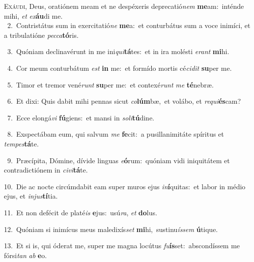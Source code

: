 \lettrine{\initial\textcolor{\initialcolor}{E}}{xáudi,} Deus, oratiónem meam et ne despéxeris deprecatió\textit{nem} \textbf{me}\-am:~\star inténde mihi, \textit{et} \textit{ex}\-\textbf{áu}di me.\\
{\numbfont\textcolor{\numbcolor}{~2.}}~Contristátus sum in exercitatió\textit{ne} \textbf{me}\-a:~\star et conturbátus sum a voce inimíci, et a tribulatióne \textit{pec}\-\textit{ca}\textbf{tó}ris.\par
{\numbfont\textcolor{\numbcolor}{~3.}}~Quóniam declinavérunt in me ini\-\textit{qui}\-\textbf{tá}tes:~\star et in ira molésti \textit{e}\-\textit{rant} \textbf{mi}\-hi.\par
{\numbfont\textcolor{\numbcolor}{~4.}}~Cor meum conturbátum \textit{est} \textbf{in} me:~\star et formído mortis cé\-\textit{ci}\-\textit{dit} \textbf{su}\-per me.\par
{\numbfont\textcolor{\numbcolor}{~5.}}~Timor et tremor vené\textit{runt} \textbf{su}\-per me:~\star et contexé\textit{runt} \textit{me} \textbf{té}\-nebræ.\par
{\numbfont\textcolor{\numbcolor}{~6.}}~Et dixi: Quis dabit mihi pennas sicut \textit{co}\-\textbf{lúm}bæ,~\star et volábo, et \textit{re}\-\textit{qui}\textbf{és}cam?\par
{\numbfont\textcolor{\numbcolor}{~7.}}~Ecce elongá\textit{vi} \textbf{fú}\-giens:~\star et mansi in \textit{so}\-\textit{li}\textbf{tú}dine.\par
{\numbfont\textcolor{\numbcolor}{~8.}}~Exspectábam eum, qui salvum \textit{me} \textbf{fe}\-cit:~\star a pusillanimitáte spíritus et \textit{tem}\-\textit{pes}\textbf{tá}te.\par
{\numbfont\textcolor{\numbcolor}{~9.}}~Præcípita, Dómine, dívide linguas \textit{e}\-\textbf{ó}rum:~\star quóniam vidi iniquitátem et contradictiónem in \textit{ci}\-\textit{vi}\textbf{tá}te.\par
{\numbfont\textcolor{\numbcolor}{10.}}~Die ac nocte circúmdabit eam super muros ejus \textit{in}\-\textbf{í}quitas:~\star et labor in médio ejus, et \textit{in}\-\textit{jus}\textbf{tí}tia.\par
{\numbfont\textcolor{\numbcolor}{11.}}~Et non defécit de platé\textit{is} \textbf{e}\-jus:~\star usú\-\textit{ra}\-, \textit{et} \textbf{do}\-lus.\par
{\numbfont\textcolor{\numbcolor}{12.}}~Quóniam si inimícus meus maledixís\textit{set} \textbf{mi}\-hi,~\star sustinu\-\textit{ís}\-\textit{sem} \textbf{ú}\-tique.\par
{\numbfont\textcolor{\numbcolor}{13.}}~Et si is, qui óderat me, super me magna locútus \textit{fu}\-\textbf{ís}set:~\star abscondíssem me fórsi\textit{tan} \textit{ab} \textbf{e}\-o.\par
